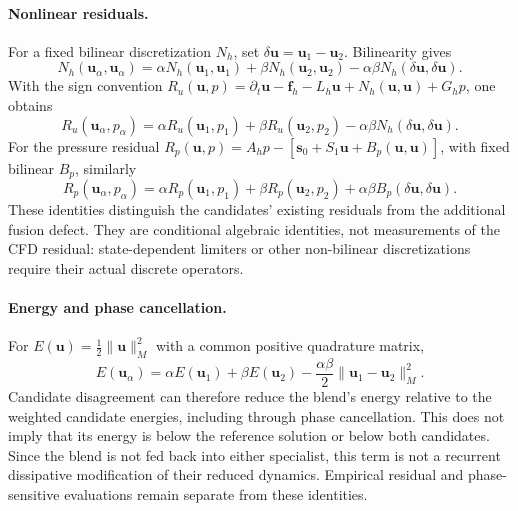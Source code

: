 \documentclass{article}
\begin{document}
\paragraph{Nonlinear residuals.}
For a fixed bilinear discretization $N_h$, set $\delta\bm u=\bm u_1-\bm u_2$. Bilinearity gives
\begin{equation}
N_h(\bm u_\alpha,\bm u_\alpha)
=\alpha N_h(\bm u_1,\bm u_1)+\beta N_h(\bm u_2,\bm u_2)
-\alpha\beta N_h(\delta\bm u,\delta\bm u).
\end{equation}
With the sign convention
$R_u(\bm u,p)=\partial_t\bm u-\bm f_h-L_h\bm u+N_h(\bm u,\bm u)+G_hp$, one obtains
\begin{equation}
R_u(\bm u_\alpha,p_\alpha)
=\alpha R_u(\bm u_1,p_1)+\beta R_u(\bm u_2,p_2)
-\alpha\beta N_h(\delta\bm u,\delta\bm u).
\end{equation}
For the pressure residual
$R_p(\bm u,p)=A_hp-[\bm s_0+S_1\bm u+B_p(\bm u,\bm u)]$, with fixed bilinear $B_p$, similarly
\begin{equation}
R_p(\bm u_\alpha,p_\alpha)
=\alpha R_p(\bm u_1,p_1)+\beta R_p(\bm u_2,p_2)
+\alpha\beta B_p(\delta\bm u,\delta\bm u).
\end{equation}
These identities distinguish the candidates' existing residuals from the additional fusion defect. They are conditional algebraic identities, not measurements of the CFD residual: state-dependent limiters or other non-bilinear discretizations require their actual discrete operators.

\paragraph{Energy and phase cancellation.}
For $E(\bm u)=\tfrac12\|\bm u\|_M^2$ with a common positive quadrature matrix,
\begin{equation}
E(\bm u_\alpha)=\alpha E(\bm u_1)+\beta E(\bm u_2)
-\frac{\alpha\beta}{2}\|\bm u_1-\bm u_2\|_M^2.
\end{equation}
Candidate disagreement can therefore reduce the blend's energy relative to the weighted candidate energies, including through phase cancellation. This does not imply that its energy is below the reference solution or below both candidates. Since the blend is not fed back into either specialist, this term is not a recurrent dissipative modification of their reduced dynamics. Empirical residual and phase-sensitive evaluations remain separate from these identities.
\end{document}
